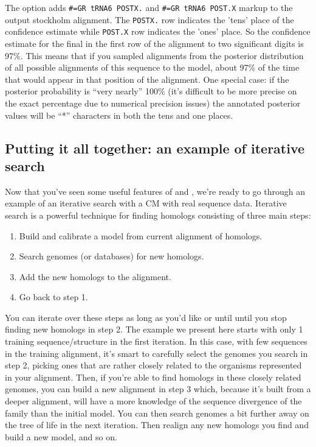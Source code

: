 The  option adds {\small\verb+#=GR tRNA6 POSTX.+} and
{\small\verb+#=GR tRNA6 POST.X+} markup to the output stockholm
alignment. The {\small\verb+POSTX.+} row indicates the 'tens' place of
the confidence estimate while {\small\verb+POST.X+} row indicates the
'ones' place. So the confidence estimate for the final  in the
first row of the alignment to two significant digits is 97\%. This
means that if you sampled alignments from the posterior distribution
of all possible alignments of this sequence to the model, about 97\%
of the time that  would appear in that position of the
alignment. One special case: if the posterior probability is ``very
nearly'' 100\% (it's difficult to be more precise on the exact
percentage due to numerical precision issues) the annotated posterior
values will be ``*'' characters in both the tens and one places.

\newpage
\subsection{Putting it all together: an example of iterative search}

Now that you've seen some useful features of  and
, we're ready to go through an example of an iterative
search with a CM with real sequence data. Iterative search is a powerful
technique for finding homologs consisting of three main steps:
\begin{enumerate}
\item
  Build and calibrate a model from current alignment of homologs.
\item 
  Search genomes (or databases) for new homologs.
\item
  Add the new homologs to the alignment.
\item
  Go back to step 1.
\end{enumerate}

You can iterate over these steps as long as you'd like or until
until you stop finding new homologs in step 2.  The example we present
here starts with only 1 training sequence/structure in the first
iteration. In this case, with few sequences in the training alignment,
it's smart to carefully select the genomes you search in step 2,
picking ones that are rather closely related to the organisms
represented in your alignment. Then, if you're able to find homologs
in these closely related genomes, you can build a new alignment
in step 3 which, because it's built from a deeper alignment, will have
a more knowledge of the sequence divergence of the family than
the initial model. You can then search genomes a bit further away on
the tree of life in the next iteration. Then realign any new homologs
you find and build a new model, and so on. 

